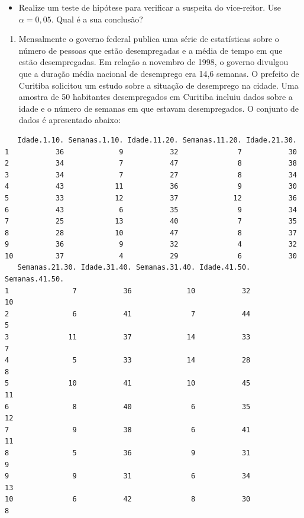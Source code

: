 \documentclass[
  10pt,
  a4paper]{book}
\providecommand{\tightlist}{%
  \setlength{\itemsep}{0pt}\setlength{\parskip}{0pt}}
\begin{document}
\begin{itemize}
\tightlist
\item
  Realize um teste de hipótese para verificar a suspeita do vice-reitor. Use \(\alpha = 0,05\). Qual é a sua conclusão?
\end{itemize}

\begin{enumerate}
\def\labelenumi{\arabic{enumi}.}
\setcounter{enumi}{3}
\tightlist
\item
  Mensalmente o governo federal publica uma série de estatísticas sobre o número de pessoas que estão desempregadas e a média de tempo em que estão desempregadas. Em relação a novembro de 1998, o governo divulgou que a duração média nacional de desemprego era 14,6 semanas. O prefeito de Curitiba solicitou um estudo sobre a situação de desemprego na cidade. Uma amostra de 50 habitantes desempregados em Curitiba incluiu dados sobre a idade e o número de semanas em que estavam desempregados. O conjunto de dados é apresentado abaixo:
\end{enumerate}

\begin{verbatim}
   Idade.1.10. Semanas.1.10. Idade.11.20. Semanas.11.20. Idade.21.30.
1           36             9           32              7           30
2           34             7           47              8           38
3           34             7           27              8           34
4           43            11           36              9           30
5           33            12           37             12           36
6           43             6           35              9           34
7           25            13           40              7           35
8           28            10           47              8           37
9           36             9           32              4           32
10          37             4           29              6           30
   Semanas.21.30. Idade.31.40. Semanas.31.40. Idade.41.50. Semanas.41.50.
1               7           36             10           32             10
2               6           41              7           44              5
3              11           37             14           33              7
4               5           33             14           28              8
5              10           41             10           45             11
6               8           40              6           35             12
7               9           38              6           41             11
8               5           36              9           31              9
9               9           31              6           34             13
10              6           42              8           30              8
\end{verbatim}
\end{document}
